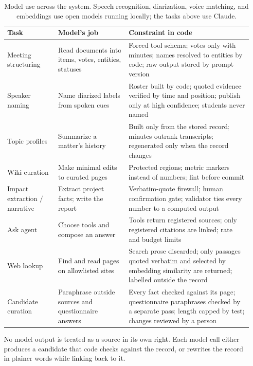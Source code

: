 \documentclass[11pt]{article}
\begin{document}
\begin{table}[h]
\centering\small
\begin{tabularx}{\linewidth}{@{}lLL@{}}
\toprule
Task & Model's job & Constraint in code \\
\midrule
Meeting structuring & Read documents into items, votes, entities, statuses & Forced tool schema; votes only with minutes; names resolved to entities by code; raw output stored by prompt version \\
Speaker naming & Name diarized labels from spoken cues & Roster built by code; quoted evidence verified by time and position; publish only at high confidence; students never named \\
Topic profiles & Summarize a matter's history & Built only from the stored record; minutes outrank transcripts; regenerated only when the record changes \\
Wiki curation & Make minimal edits to curated pages & Protected regions; metric markers instead of numbers; lint before commit \\
Impact extraction / narrative & Extract project facts; write the report & Verbatim-quote firewall; human confirmation gate; validator ties every number to a computed output \\
Ask agent & Choose tools and compose an answer & Tools return registered sources; only registered citations are linked; rate and budget limits \\
Web lookup & Find and read pages on allowlisted sites & Search prose discarded; only passages quoted verbatim and selected by embedding similarity are returned; labelled outside the record \\
Candidate curation & Paraphrase outside sources and questionnaire answers & Every fact checked against its page; questionnaire paraphrases checked by a separate pass; length capped by test; changes reviewed by a person \\
\bottomrule
\end{tabularx}
\caption{Model use across the system. Speech recognition, diarization, voice matching,
and embeddings use open models running locally; the tasks above use Claude.}
\end{table}

No model output is treated as a source in its own right. Each model call either produces a
candidate that code checks against the record, or rewrites the record in plainer words
while linking back to it.

\end{document}

